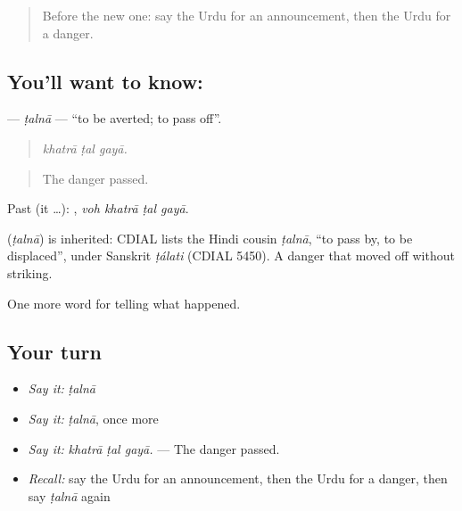 \begin{quote}
Before the new one: say the Urdu for an announcement, then the Urdu for a danger.
\end{quote}

\subsection*{You'll want to know: }
\textbf{} — \emph{ṭalnā} — \textquotedblleft{}to be averted; to pass off\textquotedblright{}.

\begin{quote}
  
\end{quote}

\begin{quote}
\emph{khatrā ṭal gayā.}
\end{quote}

\begin{quote}
The danger passed.
\end{quote}

Past (it …):    , \emph{voh khatrā ṭal gayā}.

\begin{cousinweb}
\textbf{} (\emph{ṭalnā}) is inherited: CDIAL lists the Hindi cousin \emph{ṭalnā}, \textquotedblleft{}to pass by, to be displaced\textquotedblright{}, under Sanskrit \emph{ṭálati} (CDIAL 5450). A danger that \textbf{ } moved off without striking.
\end{cousinweb}

\begin{grammarlens}[title={What you've built}]
One more word for telling what happened.
\end{grammarlens}

\subsection*{Your turn}
\begin{itemize}
\raggedright
  \item \emph{Say it:} \emph{ṭalnā}
  \item \emph{Say it:} \emph{ṭalnā}, once more
  \item \emph{Say it:} \emph{khatrā ṭal gayā.} — The danger passed.
  \item \emph{Recall:} say the Urdu for an announcement, then the Urdu for a danger, then say \emph{ṭalnā} again
\end{itemize}


